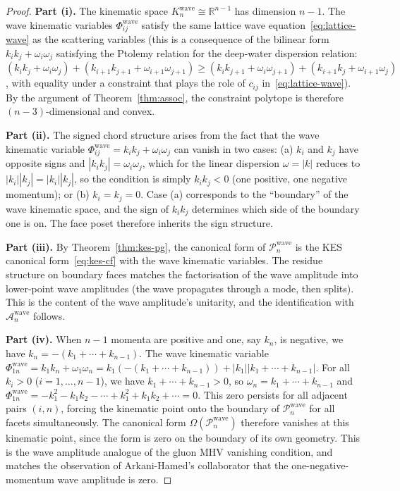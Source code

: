 \documentclass[12pt, oneside]{amsart}
\theoremstyle{plain}
\theoremstyle{definition}
\theoremstyle{remark}
\newcommand{\R}{\mathbb{R}}
\newcommand{\Amp}{\mathcal{A}}
\newcommand{\CF}{\Omega}   %
\begin{document}
\begin{proof}
\textbf{Part (i).} The kinematic space $K_n^{\text{wave}} \cong \R^{n-1}$ has dimension $n-1$. The wave kinematic variables $\Phi_{ij}^{\text{wave}}$ satisfy the same lattice wave equation~\eqref{eq:lattice-wave} as the scattering variables (this is a consequence of the bilinear form $k_i k_j + \omega_i\omega_j$ satisfying the Ptolemy relation for the deep-water dispersion relation: $(k_i k_j + \omega_i\omega_j) + (k_{i+1}k_{j+1} + \omega_{i+1}\omega_{j+1}) \geq (k_i k_{j+1} + \omega_i\omega_{j+1}) + (k_{i+1}k_j + \omega_{i+1}\omega_j)$, with equality under a constraint that plays the role of $c_{ij}$ in~\eqref{eq:lattice-wave}). By the argument of Theorem~\ref{thm:assoc}, the constraint polytope is therefore $(n-3)$-dimensional and convex.

\textbf{Part (ii).} The signed chord structure arises from the fact that the wave kinematic variable $\Phi_{ij}^{\text{wave}} = k_i k_j + \omega_i\omega_j$ can vanish in two cases: (a) $k_i$ and $k_j$ have opposite signs and $|k_i k_j| = \omega_i\omega_j$, which for the linear dispersion $\omega = |k|$ reduces to $|k_i||k_j| = |k_i||k_j|$, so the condition is simply $k_i k_j < 0$ (one positive, one negative momentum); or (b) $k_i = k_j = 0$. Case (a) corresponds to the ``boundary'' of the wave kinematic space, and the sign of $k_i k_j$ determines which side of the boundary one is on. The face poset therefore inherits the sign structure.

\textbf{Part (iii).} By Theorem~\ref{thm:kes-pg}, the canonical form of $\mathcal{P}_n^{\text{wave}}$ is the KES canonical form~\eqref{eq:kes-cf} with the wave kinematic variables. The residue structure on boundary faces matches the factorisation of the wave amplitude into lower-point wave amplitudes (the wave propagates through a mode, then splits). This is the content of the wave amplitude's unitarity, and the identification with $\Amp_n^{\text{wave}}$ follows.

\textbf{Part (iv).} When $n-1$ momenta are positive and one, say $k_n$, is negative, we have $k_n = -(k_1 + \cdots + k_{n-1})$. The wave kinematic variable $\Phi_{1n}^{\text{wave}} = k_1 k_n + \omega_1\omega_n = k_1(-(k_1+\cdots+k_{n-1})) + |k_1||k_1+\cdots+k_{n-1}|$. For all $k_i > 0$ ($i = 1, \ldots, n-1$), we have $k_1 + \cdots + k_{n-1} > 0$, so $\omega_n = k_1 + \cdots + k_{n-1}$ and $\Phi_{1n}^{\text{wave}} = -k_1^2 - k_1 k_2 - \cdots + k_1^2 + k_1 k_2 + \cdots = 0$. This zero persists for all adjacent pairs $(i, n)$, forcing the kinematic point onto the boundary of $\mathcal{P}_n^{\text{wave}}$ for all facets simultaneously. The canonical form $\CF(\mathcal{P}_n^{\text{wave}})$ therefore vanishes at this kinematic point, since the form is zero on the boundary of its own geometry. This is the wave amplitude analogue of the gluon MHV vanishing condition, and matches the observation of Arkani-Hamed's collaborator that the one-negative-momentum wave amplitude is zero.
\end{proof}
\end{document}
